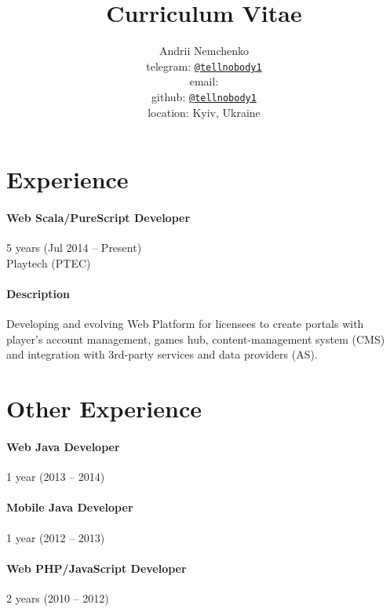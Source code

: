 

\title{Curriculum Vitae}
\author{
  Andrii Nemchenko\\
  telegram: \href{https://t.me/tellnobody1}{\nolinkurl{@tellnobody1}}\\
  email: \\
  github: \href{https://github.com/tellnobody1}{\nolinkurl{@tellnobody1}}\\
  location: Kyiv, Ukraine
}
\maketitle

\section{Experience}
\paragraph{Web Scala/PureScript Developer}
5 years (Jul 2014 – Present)\\Playtech (PTEC)
\paragraph{Description}
Developing and evolving Web Platform for licensees to create portals with player's account management, games hub, content-management system (CMS) and integration with 3rd-party services and data providers (AS).

\section{Other Experience}
\paragraph{Web Java Developer}
1 year (2013 – 2014)

\paragraph{Mobile Java Developer}
1 year (2012 – 2013)

\paragraph{Web PHP/JavaScript Developer}
2 years (2010 – 2012)

